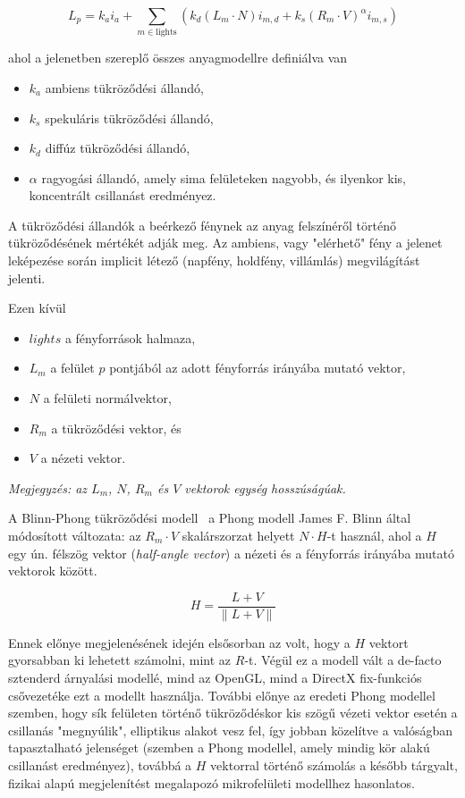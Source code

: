 \[
L_{p} = k_a i_a + \sum_{m \in \textrm{lights}} {\left( k_d (L_m \cdot N) i_{m,d} + k_s(R_m \cdot V)^\alpha i_{m,s} \right)}
\]

ahol a jelenetben szereplő összes anyagmodellre definiálva van

\begin{itemize}[noitemsep]
\item \(k_a\) ambiens tükröződési állandó,
\item \(k_s\) spekuláris tükröződési állandó,
\item \(k_d\) diffúz tükröződési állandó,
\item \(\alpha\) ragyogási állandó, amely sima felületeken nagyobb, és ilyenkor kis, koncentrált csillanást eredményez.
\end{itemize}

A tükröződési állandók a beérkező fénynek az anyag felszínéről történő tükröződésének mértékét adják meg. Az ambiens, vagy "elérhető" fény a jelenet leképezése során implicit létező (napfény, holdfény, villámlás) megvilágítást jelenti.

Ezen kívül

\begin{itemize}[noitemsep]
\item \(lights\) a fényforrások halmaza,
\item \(L_m\) a felület \(p\) pontjából az adott fényforrás irányába mutató vektor,
\item \(N\) a felületi normálvektor,
\item \(R_m\) a tükröződési vektor, és
\item \(V\) a nézeti vektor.
\end{itemize}

\textit{Megjegyzés: az \(L_m\), \(N\), \(R_m\) és \(V\) vektorok egység hosszúságúak.}

A Blinn-Phong tükröződési modell~\cite{blinn1977models} a Phong modell James F. Blinn által módosított változata: az \(R_m \cdot V\) skalárszorzat helyett \(N \cdot H\)-t használ, ahol a \(H\) egy ún. félszög vektor (\textit{half-angle vector}) a nézeti és a fényforrás irányába mutató vektorok között.

\[
H = \frac{ L + V }{ \| L + V \| }
\]

Ennek előnye megjelenésének idején elsősorban az volt, hogy a \(H\) vektort gyorsabban ki lehetett számolni, mint az \(R\)-t. Végül ez a modell vált a de-facto sztenderd árnyalási modellé, mind az OpenGL, mind a DirectX fix-funkciós csővezetéke ezt a modellt használja. További előnye az eredeti Phong modellel szemben, hogy sík felületen történő tükröződéskor kis szögű vézeti vektor esetén a csillanás "megnyúlik", elliptikus alakot vesz fel, így jobban közelítve a valóságban tapasztalható jelenséget (szemben a Phong modellel, amely mindig kör alakú csillanást eredményez), továbbá a \(H\) vektorral történő számolás a később tárgyalt, fizikai alapú megjelenítést megalapozó mikrofelületi modellhez hasonlatos.

